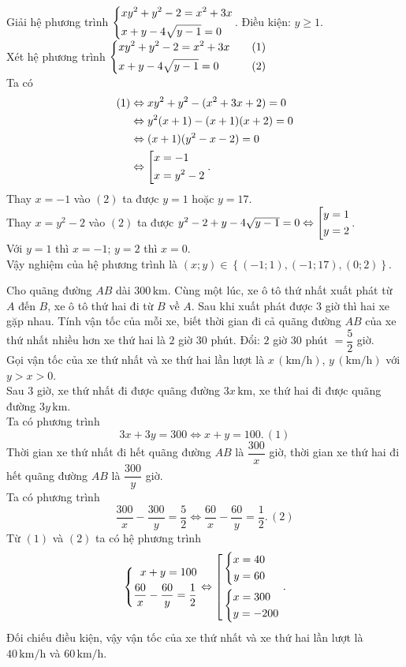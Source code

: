 \begin{ex}%
Giải hệ phương trình $\left\{\begin{aligned}&xy^2+y^2-2=x^2+3x\\ &x+y-4\sqrt{y-1}=0\end{aligned}\right.$.
	\loigiai
    {
    Điều kiện: $y\ge 1$.\\
    Xét hệ phương trình $\left\{\begin{aligned}&xy^2+y^2-2=x^2+3x \quad &(1)\\ &x+y-4\sqrt{y-1}=0 \quad &(2)\end{aligned}\right.$\\
    Ta có 
    \begin{align*}
    (1)&\Leftrightarrow xy^2+y^2-(x^2+3x+2)=0\\
    &\Leftrightarrow y^2(x+1)-(x+1)(x+2)=0\\
    &\Leftrightarrow (x+1)(y^2-x-2)=0\\
    &\Leftrightarrow \left[\begin{aligned}&x=-1\\ &x=y^2-2\end{aligned}\right..
    \end{align*}
    Thay $x=-1$ vào $(2)$ ta được $y=1$ hoặc $y=17$.\\
    Thay $x=y^2-2$ vào $(2)$ ta được $y^2-2+y-4\sqrt{y-1}=0 \Leftrightarrow \left[\begin{aligned}y=1\\ y=2\end{aligned}\right.$.\\
    Với $y=1$ thì $x=-1$; $y=2$ thì $x=0$.\\
    Vậy nghiệm của hệ phương trình là $(x;y)\in \left\{(-1;1), (-1;17), (0;2)\right\}.$
    }
\end{ex}

\begin{ex}%
Cho quãng đường $AB$ dài $300\mathrm{\,km}$. Cùng một lúc, xe ô tô thứ nhất xuất phát từ $A$ đến $B$, xe ô tô thứ hai đi từ $B$ về $A$. Sau khi xuất phát được $3$ giờ thì hai xe gặp nhau. Tính vận tốc của mỗi xe, biết thời gian đi cả quãng đường $AB$ của xe thứ nhất nhiều hơn xe thứ hai là $2$ giờ $30$ phút.
	\loigiai
    {
    Đổi: $2$ giờ $30$ phút $=\dfrac{5}{2}$ giờ.\\
    Gọi vận tốc của xe thứ nhất và xe thứ hai lần lượt là $x\mathrm{\,(km/h)}$, $y\mathrm{\,(km/h)}$ với $y>x>0$.\\ 
    Sau $3$ giờ, xe thứ nhất đi được quãng đường $3x\mathrm{\,km}$, xe thứ hai đi được quãng đường $3y\mathrm{\,km}$.\\
    Ta có phương trình $$3x+3y=300\Leftrightarrow x+y=100. \, (1)$$
    Thời gian xe thứ nhất đi hết quãng đường $AB$ là $\dfrac{300}{x}$ giờ, thời gian xe thứ hai đi hết quãng đường $AB$ là $\dfrac{300}{y}$ giờ.\\
    Ta có phương trình
    $$\dfrac{300}{x}-\dfrac{300}{y}=\dfrac{5}{2}\Leftrightarrow \dfrac{60}{x}-\dfrac{60}{y}=\dfrac{1}{2}. \, (2)$$
    Từ $(1)$ và $(2)$ ta có hệ phương trình
    $$\left\{\begin{aligned}x+y=100\\ \dfrac{60}{x}-\dfrac{60}{y}=\dfrac{1}{2}\end{aligned}\right.\Leftrightarrow \left[\begin{aligned}&\left\{\begin{aligned}x=40\\ y=60\end{aligned}\right.\\ &\left\{\begin{aligned}&x=300\\ &y=-200\end{aligned}\right.\end{aligned}\right..$$
    Đối chiếu điều kiện, vậy vận tốc của xe thứ nhất và xe thứ hai lần lượt là $40\mathrm{\, km/h}$ và $60\mathrm{\, km/h}$.
    }
\end{ex}

